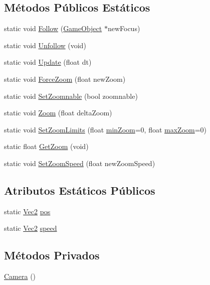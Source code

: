 \subsection*{Métodos Públicos Estáticos}
\begin{DoxyCompactItemize}
\item 
static void \hyperlink{classCamera_a4290d7e4815d2e0726d88b743d44e8df}{Follow} (\hyperlink{classGameObject}{Game\+Object} $\ast$new\+Focus)
\item 
static void \hyperlink{classCamera_aa9ca7decdebf7147c9d6dc747e7d59e9}{Unfollow} (void)
\item 
static void \hyperlink{classCamera_a3d528df411b986596b652b61120ff302}{Update} (float dt)
\item 
static void \hyperlink{classCamera_a7dc4b1fd7f5e03ffb25d306fe81ee4c0}{Force\+Zoom} (float new\+Zoom)
\item 
static void \hyperlink{classCamera_a2919142c206574be101efc1230eb3c8d}{Set\+Zoomnable} (bool zoomnable)
\item 
static void \hyperlink{classCamera_ad6638a961e2fefbe69d4d7d0a0591fb6}{Zoom} (float delta\+Zoom)
\item 
static void \hyperlink{classCamera_aa320e33bcbe395cdad9f63887ea15689}{Set\+Zoom\+Limits} (float \hyperlink{classCamera_a65d5a8e5533b568224d9fc488bfdcb28}{min\+Zoom}=0, float \hyperlink{classCamera_af418b7887d39c773d73cb179c497a8da}{max\+Zoom}=0)
\item 
static float \hyperlink{classCamera_af6fe062fcf5e1e31224d4dd9f6cafa51}{Get\+Zoom} (void)
\item 
static void \hyperlink{classCamera_a4373a9b1baa7b98e4fe5859e0645baed}{Set\+Zoom\+Speed} (float new\+Zoom\+Speed)
\end{DoxyCompactItemize}
\subsection*{Atributos Estáticos Públicos}
\begin{DoxyCompactItemize}
\item 
static \hyperlink{classVec2}{Vec2} \hyperlink{classCamera_a748c4e2867e34f45a431a1d2dcc6fee2}{pos}
\item 
static \hyperlink{classVec2}{Vec2} \hyperlink{classCamera_aa0d0a54eb56182723dbd0ce61e0b3e8d}{speed}
\end{DoxyCompactItemize}
\subsection*{Métodos Privados}
\begin{DoxyCompactItemize}
\item 
\hyperlink{classCamera_a01f94c3543f56ede7af49dc778f19331}{Camera} ()
\end{DoxyCompactItemize}

